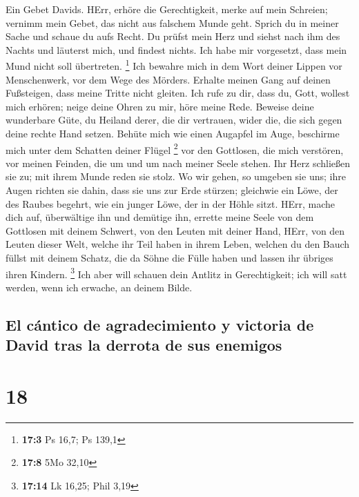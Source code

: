 Ein Gebet Davids. HErr, erhöre die Gerechtigkeit, merke
auf mein Schreien; vernimm mein Gebet, das nicht aus falschem Munde
geht.  Sprich du in meiner Sache und schaue du aufs Recht.
 Du prüfst mein Herz und siehst nach ihm des Nachts und
läuterst mich, und findest nichts. Ich habe mir vorgesetzt, dass mein
Mund nicht soll übertreten. \footnote{\textbf{17:3} Ps 16,7; Ps 139,1}
 Ich bewahre mich in dem Wort deiner Lippen vor
Menschenwerk, vor dem Wege des Mörders.  Erhalte meinen
Gang auf deinen Fußsteigen, dass meine Tritte nicht gleiten.
 Ich rufe zu dir, dass du, Gott, wollest mich erhören;
neige deine Ohren zu mir, höre meine Rede.  Beweise deine
wunderbare Güte, du Heiland derer, die dir vertrauen, wider die, die
sich gegen deine rechte Hand setzen.  Behüte mich wie
einen Augapfel im Auge, beschirme mich unter dem Schatten deiner Flügel
\footnote{\textbf{17:8} 5Mo 32,10}  vor den Gottlosen, die
mich verstören, vor meinen Feinden, die um und um nach meiner Seele
stehen.  Ihr Herz schließen sie zu; mit ihrem Munde reden
sie stolz.  Wo wir gehen, so umgeben sie uns; ihre Augen
richten sie dahin, dass sie uns zur Erde stürzen; 
gleichwie ein Löwe, der des Raubes begehrt, wie ein junger Löwe, der in
der Höhle sitzt.  HErr, mache dich auf, überwältige ihn
und demütige ihn, errette meine Seele von dem Gottlosen mit deinem
Schwert,  von den Leuten mit deiner Hand, HErr, von den
Leuten dieser Welt, welche ihr Teil haben in ihrem Leben, welchen du den
Bauch füllst mit deinem Schatz, die da Söhne die Fülle haben und lassen
ihr übriges ihren Kindern. \footnote{\textbf{17:14} Lk 16,25; Phil 3,19}
 Ich aber will schauen dein Antlitz in Gerechtigkeit; ich
will satt werden, wenn ich erwache, an deinem Bilde.

\hypertarget{el-cuxe1ntico-de-agradecimiento-y-victoria-de-david-tras-la-derrota-de-sus-enemigos}{%
\subsection{El cántico de agradecimiento y victoria de David tras la
derrota de sus
enemigos}\label{el-cuxe1ntico-de-agradecimiento-y-victoria-de-david-tras-la-derrota-de-sus-enemigos}}

\hypertarget{section-17}{%
\section{18}\label{section-17}}

